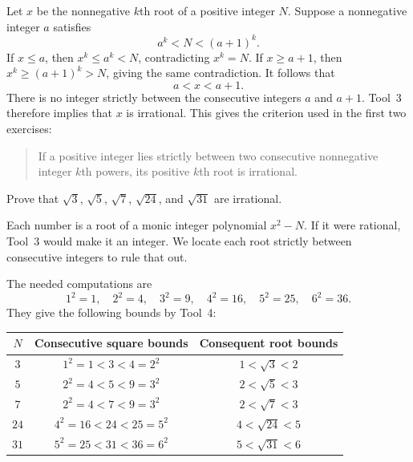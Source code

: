 Let $x$ be the nonnegative $k$th root of a positive integer $N$.
Suppose a nonnegative integer $a$ satisfies
\[
 a^k<N<(a+1)^k.
\]
If $x\le a$, then $x^k\le a^k<N$, contradicting $x^k=N$.
If $x\ge a+1$, then $x^k\ge(a+1)^k>N$, giving the same contradiction.
It follows that
\[
 a<x<a+1.
\]
There is no integer strictly between the consecutive integers $a$ and
$a+1$. Tool~3 therefore implies that $x$ is irrational. This gives the
criterion used in the first two exercises:
\begin{quote}
If a positive integer lies strictly between two consecutive nonnegative
integer $k$th powers, its positive $k$th root is irrational.
\end{quote}

\goal Prove that $\sqrt3$, $\sqrt5$, $\sqrt7$, $\sqrt{24}$, and
$\sqrt{31}$ are irrational.

\idea Each number is a root of a monic integer polynomial $x^2-N$.
If it were rational, Tool~3 would make it an integer. We locate each
root strictly between consecutive integers to rule that out.

The needed computations are
\[
 1^2=1,\quad 2^2=4,\quad 3^2=9,\quad
 4^2=16,\quad 5^2=25,\quad 6^2=36.
\]
They give the following bounds by Tool~4:
\begin{center}
\begin{tabular}{@{}ccc@{}}
\toprule
$N$ & Consecutive square bounds & Consequent root bounds\\
\midrule
$3$  & $1^2=1<3<4=2^2$   & $1<\sqrt3<2$\\
$5$  & $2^2=4<5<9=3^2$   & $2<\sqrt5<3$\\
$7$  & $2^2=4<7<9=3^2$   & $2<\sqrt7<3$\\
$24$ & $4^2=16<24<25=5^2$ & $4<\sqrt{24}<5$\\
$31$ & $5^2=25<31<36=6^2$ & $5<\sqrt{31}<6$\\
\bottomrule
\end{tabular}
\end{center}

